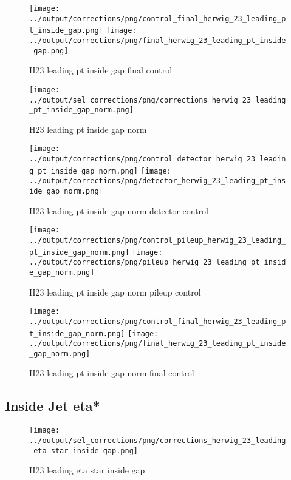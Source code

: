 \documentclass[11pt]{book}
\begin{document}
\begin{figure}[ht]
\centering
\texttt{[image: ../output/corrections/png/control\_final\_herwig\_23\_leading\_pt\_inside\_gap.png]}
\texttt{[image: ../output/corrections/png/final\_herwig\_23\_leading\_pt\_inside\_gap.png]}
\caption{H23 leading pt inside gap final control}
\label{fig:H23_leading_pt_inside_gap_final_control}
\end{figure}



\begin{figure}[ht]
\centering
\texttt{[image: ../output/sel\_corrections/png/corrections\_herwig\_23\_leading\_pt\_inside\_gap\_norm.png]}
\caption{H23 leading pt inside gap norm}
\label{fig:H23_leading_pt_inside_gap_norm}
\end{figure}

\begin{figure}[ht]
\centering
\texttt{[image: ../output/corrections/png/control\_detector\_herwig\_23\_leading\_pt\_inside\_gap\_norm.png]}
\texttt{[image: ../output/corrections/png/detector\_herwig\_23\_leading\_pt\_inside\_gap\_norm.png]}
\caption{H23 leading pt inside gap norm detector control}
\label{fig:H23_leading_pt_inside_gap_norm_detector_control}
\end{figure}

\begin{figure}[ht]
\centering
\texttt{[image: ../output/corrections/png/control\_pileup\_herwig\_23\_leading\_pt\_inside\_gap\_norm.png]}
\texttt{[image: ../output/corrections/png/pileup\_herwig\_23\_leading\_pt\_inside\_gap\_norm.png]}
\caption{H23 leading pt inside gap norm pileup control}
\label{fig:H23_leading_pt_inside_gap_norm_pileup_control}
\end{figure}


\begin{figure}[ht]
\centering
\texttt{[image: ../output/corrections/png/control\_final\_herwig\_23\_leading\_pt\_inside\_gap\_norm.png]}
\texttt{[image: ../output/corrections/png/final\_herwig\_23\_leading\_pt\_inside\_gap\_norm.png]}
\caption{H23 leading pt inside gap norm final control}
\label{fig:H23_leading_pt_inside_gap_norm_final_control}
\end{figure}



\clearpage
\subsection{Inside Jet eta*}
\begin{figure}[ht]
\centering
\texttt{[image: ../output/sel\_corrections/png/corrections\_herwig\_23\_leading\_eta\_star\_inside\_gap.png]}
\caption{H23 leading eta star inside gap}
\label{fig:H23_leading_eta_star_inside_gap}
\end{figure}
\end{document}
